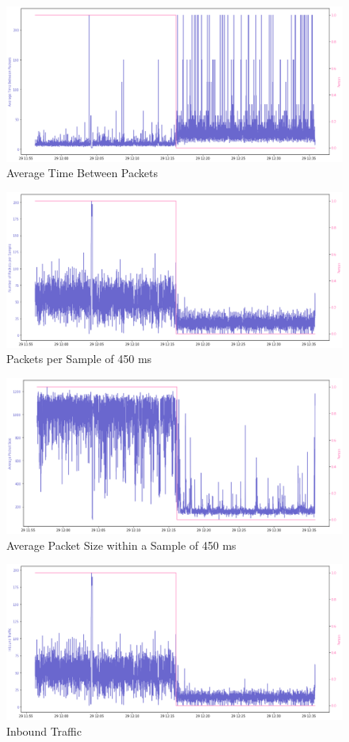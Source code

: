 \documentclass{article}
\begin{document}
\begin{figure}[h!]
	\centering
	\includegraphics[width=12cm]{assets/avg-inter-time.png}
	\caption{Average Time Between Packets}
	\label{fig::avg-inter-time}
\end{figure}

\begin{figure}[h!]
	\centering
	\includegraphics[width=12cm]{assets/packets-per-sample.png}
	\caption{Packets per Sample of 450 ms}
	\label{fig::pkt-per-sample}
\end{figure}

\begin{figure}[h!]
	\centering
	\includegraphics[width=12cm]{assets/avg-pkt-size.png}
	\caption{Average Packet Size within a Sample of 450 ms}
	\label{fig::avg-pkt-size}
\end{figure}

\begin{figure}[h!]
	\centering
	\includegraphics[width=12cm]{assets/inbound-traffic.png}
	\caption{Inbound Traffic}
	\label{fig::inbound-traffic}
\end{figure}
\end{document}
